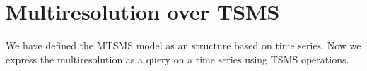 












\section{Multiresolution over TSMS}
\label{sec:M+TSMS}


We have defined the MTSMS model as an structure based on time
series. Now we express the multiresolution as a query on a time series
using TSMS operations. 

